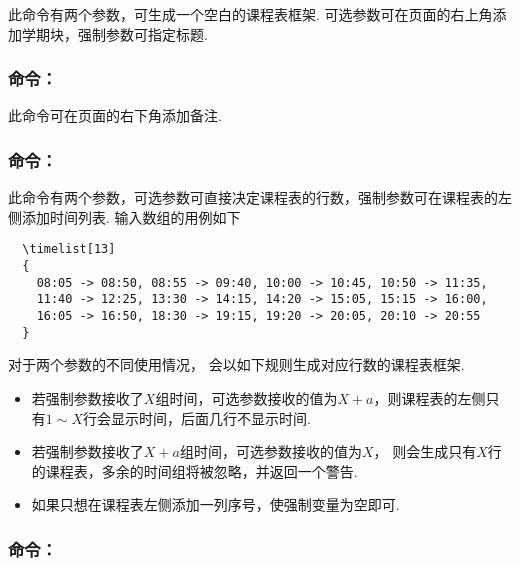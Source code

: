 \documentclass[letterpaper]{l3doc}
\newenvironment{example}{\begin{list}{}{\leftmargin=\parindent}\item }{\end{list}}
\begin{document}
\begin{example}
  \qquad
\end{example}

此命令有两个参数，可生成一个空白的课程表框架. 可选参数可在页面的右上角添加学期块，强制参数可指定标题.

\subsubsection{命令：}

\begin{example}
\end{example}

此命令可在页面的右下角添加备注.

\subsubsection{命令：}

\begin{example}
  \qquad
\end{example}

此命令有两个参数，可选参数可直接决定课程表的行数，强制参数可在课程表的左侧添加时间列表. 输入数组的用例如下

\begin{Verbatim}
  \timelist[13]
  {
    08:05 -> 08:50, 08:55 -> 09:40, 10:00 -> 10:45, 10:50 -> 11:35,
    11:40 -> 12:25, 13:30 -> 14:15, 14:20 -> 15:05, 15:15 -> 16:00,
    16:05 -> 16:50, 18:30 -> 19:15, 19:20 -> 20:05, 20:10 -> 20:55
  }
\end{Verbatim}

对于两个参数的不同使用情况， 会以如下规则生成对应行数的课程表框架.

\begin{itemize}
  \item 若强制参数接收了$X$组时间，可选参数接收的值为$X+a$，则课程表的左侧只有$1 \sim X$行会显示时间，后面几行不显示时间.
  \item 若强制参数接收了$X+a$组时间，可选参数接收的值为$X$， 则会生成只有$X$行的课程表，多余的时间组将被忽略，并返回一个警告.
  \item 如果只想在课程表左侧添加一列序号，使强制变量为空即可.
\end{itemize}

\subsubsection{命令：}
\end{document}
